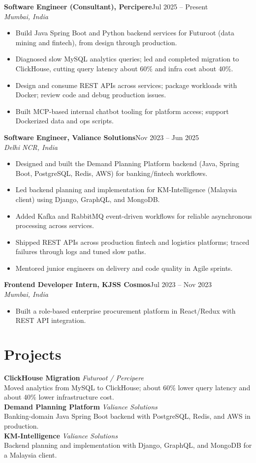 \documentclass[9pt,letterpaper]{extarticle}
\newcommand{\job}[3]{%
  \noindent\textbf{#1}\hfill{#2}\\[0pt]
  \noindent\textit{#3}\vspace{1.5pt}\par
}
\begin{document}
\job{Software Engineer (Consultant), Percipere}{Jul 2025 -- Present}{Mumbai, India}
\begin{itemize}
  \item Build Java Spring Boot and Python backend services for Futuroot (data mining and fintech), from design through production.
  \item Diagnosed slow MySQL analytics queries; led and completed migration to ClickHouse, cutting query latency about 60\% and infra cost about 40\%.
  \item Design and consume REST APIs across services; package workloads with Docker; review code and debug production issues.
  \item Built MCP-based internal chatbot tooling for platform access; support Dockerized data and ops scripts.
\end{itemize}

\job{Software Engineer, Valiance Solutions}{Nov 2023 -- Jun 2025}{Delhi NCR, India}
\begin{itemize}
  \item Designed and built the Demand Planning Platform backend (Java, Spring Boot, PostgreSQL, Redis, AWS) for banking/fintech workflows.
  \item Led backend planning and implementation for KM-Intelligence (Malaysia client) using Django, GraphQL, and MongoDB.
  \item Added Kafka and RabbitMQ event-driven workflows for reliable asynchronous processing across services.
  \item Shipped REST APIs across production fintech and logistics platforms; traced failures through logs and tuned slow paths.
  \item Mentored junior engineers on delivery and code quality in Agile sprints.
\end{itemize}

\job{Frontend Developer Intern, KJSS Cosmos}{Jul 2023 -- Nov 2023}{Mumbai, India}
\begin{itemize}
  \item Built a role-based enterprise procurement platform in React/Redux with REST API integration.
\end{itemize}

\section*{Projects}
\noindent\textbf{ClickHouse Migration} \textit{Futuroot / Percipere}\\
Moved analytics from MySQL to ClickHouse; about 60\% lower query latency and about 40\% lower infrastructure cost.\\[3pt]
\noindent\textbf{Demand Planning Platform} \textit{Valiance Solutions}\\
Banking-domain Java Spring Boot backend with PostgreSQL, Redis, and AWS in production.\\[3pt]
\noindent\textbf{KM-Intelligence} \textit{Valiance Solutions}\\
Backend planning and implementation with Django, GraphQL, and MongoDB for a Malaysia client.
\end{document}
